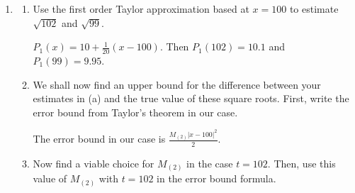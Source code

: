 \documentclass[main]{subfiles}
\begin{document}
\begin{enumerate}
\begin{enumerate}
\end{enumerate}
\pspace{\newpage}
  \begin{problemonly} 
  \begin{framed}
  \textbf{Remainder Theorem.} Let $f$ be a function whose $n$-th Taylor polynomial is $P_n(x)=\displaystyle \sum_{k = 0}^{n}
    \frac{f^{k}(c)}{k!}(x-c)^{k}$.
    and suppose $M_{(n+1)}$ is an upper bound for $|f^{(n+1)}(x)|$ on the interval between $x$ and $c$.  Then
    $$
      |f(x) - P_{n}(x)| \leq \frac{M_{(n+1)}}{(n+1)!}|x-c|^{n+1} 
    $$
\end{framed}
\end{problemonly}
\item \begin{enumerate}
    \item \begin{problem}[\vfill]
        Use the first order Taylor approximation based at $x = 100$ to estimate $\sqrt{102}$ and $\sqrt{99}$.
    \end{problem}

    \begin{solution}
        $P_1(x)=10+\frac{1}{20}(x-100)$.
        Then $P_1(102)=10.1$ and $P_1(99)=9.95$.
    \end{solution}
\item \begin{problem}[\vfill]
    We shall now find an upper bound for the difference between your estimates in (a) and the true
value of these square roots. First, write the error bound from Taylor’s theorem in our case.
\end{problem}

\begin{solution}
    The error bound in our case is $\frac{M_{(2)}|x-100|^2}{2}$.
\end{solution}
\item \begin{problem}[\vfill]
    Now find a viable choice for $M_{(2)}$ in the case $t = 102$. Then, use this value of $M_{(2)}$ with $t = 102$ in the error bound formula.
\end{problem}


\end{enumerate}
\end{enumerate}
\end{document}
